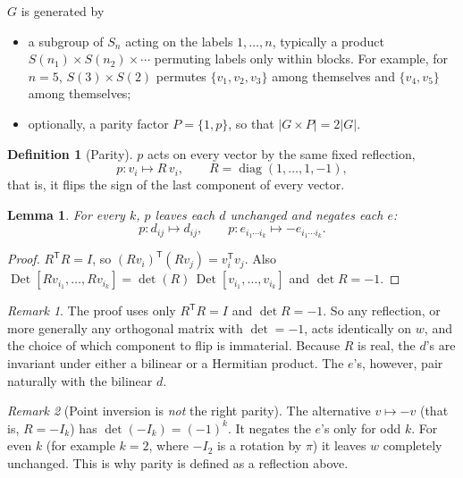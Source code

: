 \documentclass[11pt]{article}
\newtheorem{lemma}{Lemma}
\theoremstyle{definition}
\newtheorem{definition}{Definition}
\theoremstyle{remark}
\newtheorem{remark}{Remark}
\newcommand{\Det}{\operatorname{Det}}
\begin{document}
$G$ is generated by
\begin{itemize}
  \item a subgroup of $S_n$ acting on the labels $1, \ldots, n$, typically a
    product $S(n_1) \times S(n_2) \times \cdots$ permuting labels only within
    blocks. For example, for $n = 5$, $S(3) \times S(2)$ permutes
    $\{v_1, v_2, v_3\}$ among themselves and $\{v_4, v_5\}$ among themselves;
  \item optionally, a parity factor $P = \{1, p\}$, so that
    $|G \times P| = 2|G|$.
\end{itemize}

\begin{definition}[Parity]
$p$ acts on every vector by the same fixed reflection,
\[
  p : v_i \mapsto R\, v_i, \qquad R = \operatorname{diag}(1, \ldots, 1, -1),
\]
that is, it flips the sign of the last component of every vector.
\end{definition}

\begin{lemma}\label{lem:parity}
For every $k$, $p$ leaves each $d$ unchanged and negates each $e$:
\[
  p : d_{ij} \mapsto d_{ij}, \qquad p : e_{i_1 \cdots i_k} \mapsto -e_{i_1 \cdots i_k}.
\]
\end{lemma}
\begin{proof}
$R^{\mathsf T} R = I$, so $(R v_i)^{\mathsf T}(R v_j) = v_i^{\mathsf T} v_j$.
Also $\Det[R v_{i_1}, \ldots, R v_{i_k}] = \det(R)\,\Det[v_{i_1}, \ldots, v_{i_k}]$
and $\det R = -1$.
\end{proof}

\begin{remark}
The proof uses only $R^{\mathsf T} R = I$ and $\det R = -1$. So any reflection,
or more generally any orthogonal matrix with $\det = -1$, acts identically on
$w$, and the choice of which component to flip is immaterial. Because $R$ is
real, the $d$'s are invariant under either a bilinear or a Hermitian product.
The $e$'s, however, pair naturally with the bilinear $d$.
\end{remark}

\begin{remark}[Point inversion is \emph{not} the right parity]
The alternative $v \mapsto -v$ (that is, $R = -I_k$) has
$\det(-I_k) = (-1)^k$. It negates the $e$'s only for odd $k$. For even $k$
(for example $k = 2$, where $-I_2$ is a rotation by $\pi$) it leaves $w$
completely unchanged. This is why parity is defined as a reflection above.
\end{remark}
\end{document}
